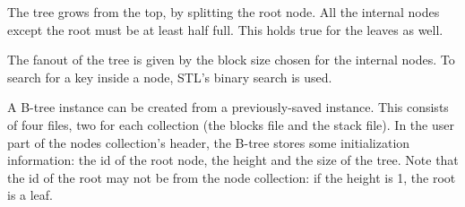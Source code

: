 The tree grows from the top, by splitting the root node. All the
internal nodes except the root must be at least half full. This holds
true for the leaves as well.

The fanout of the tree is given by the block size chosen for the
internal nodes. To search for a key inside a node, STL's binary search
is used.

A B-tree instance can be created from a previously-saved instance. This
consists of four files, two for each collection (the blocks file and
the stack file). In the user part of the nodes collection's header,
the B-tree stores some initialization information: the id of the root
node, the height and the size of the tree. Note that the id of the
root may not be
from the node collection: if the height is 1, the root is a leaf.

